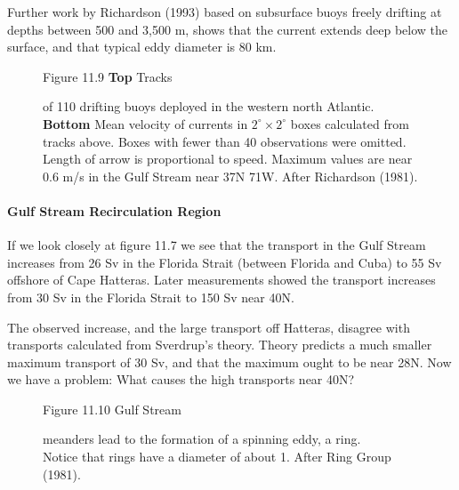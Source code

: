 Further work by Richardson (1993) based on subsurface buoys freely drifting at
depths between 500 and 3,500 m, shows that the current extends deep below the
surface, and that typical eddy diameter is 80 km.

\begin{figure}[t!]
\footnotesize
Figure 11.9 \textbf{Top} Tracks \rule{0mm}{2ex}of 110 drifting buoys deployed in
the western north Atlantic.
\textbf{Bottom} Mean velocity of currents in $2^{\circ} \times 2^{\circ}$ boxes
calculated from tracks above. Boxes with fewer than 40 observations were omitted.
Length of arrow is proportional to speed. Maximum values are near 0.6 m/s in the
Gulf Stream near 37\degrees N 71\degrees W. After Richardson (1981).

\label{fig:drifters}
\vspace{-5ex}
\end{figure}

\paragraph{Gulf Stream Recirculation Region}
If we look closely at figure 11.7 we see that the
transport in the Gulf Stream increases from 26 Sv in the
Florida Strait (between Florida and Cuba) to 55 Sv offshore of Cape Hatteras. Later
measurements showed the transport increases from 30 Sv in the Florida Strait to 150 Sv near
40\degrees N.

The observed increase, and the large transport off Hatteras, disagree with
transports calculated from Sverdrup's theory. Theory predicts a much smaller
maximum transport of 30 Sv, and that the maximum ought to be near 28\degrees N.
Now we have a problem: What causes the high transports near 40\degrees N?

\begin{figure}[t!]
\centering
\footnotesize Figure 11.10 Gulf Stream \rule{0mm}{5ex}meanders lead to the
formation of a spinning eddy, a ring.\\Notice that rings have a diameter of about
1\degrees. After Ring Group (1981).

\label{fig:ringformation}
\vspace{-3ex}
\end{figure}

